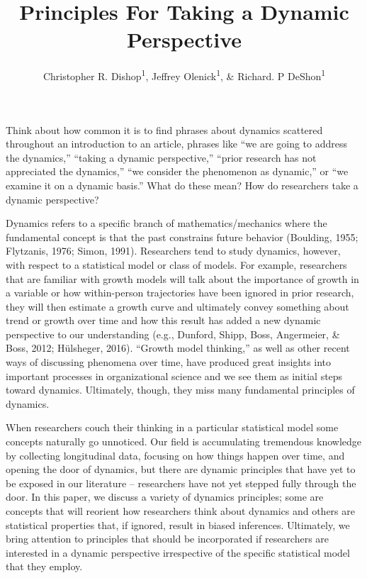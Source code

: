 \documentclass[english,,man]{apa6}
\title{Principles For Taking a Dynamic Perspective}
\author{Christopher R. Dishop\textsuperscript{1}, Jeffrey
Olenick\textsuperscript{1}, \& Richard. P DeShon\textsuperscript{1}}
\date{}
\affiliation{
\vspace{0.5cm}
\textsuperscript{1} Michigan State University}
\theoremstyle{definition}
\theoremstyle{definition}
\theoremstyle{definition}
\theoremstyle{remark}
\begin{document}
\maketitle

Think about how common it is to find phrases about dynamics scattered
throughout an introduction to an article, phrases like \enquote{we are
going to address the dynamics,} \enquote{taking a dynamic perspective,}
\enquote{prior research has not appreciated the dynamics,} \enquote{we
consider the phenomenon as dynamic,} or \enquote{we examine it on a
dynamic basis.} What do these mean? How do researchers take a dynamic
perspective?

Dynamics refers to a specific branch of mathematics/mechanics where the
fundamental concept is that the past constrains future behavior
(Boulding, 1955; Flytzanis, 1976; Simon, 1991). Researchers tend to
study dynamics, however, with respect to a statistical model or class of
models. For example, researchers that are familiar with growth models
will talk about the importance of growth in a variable or how
within-person trajectories have been ignored in prior research, they
will then estimate a growth curve and ultimately convey something about
trend or growth over time and how this result has added a new dynamic
perspective to our understanding (e.g., Dunford, Shipp, Boss,
Angermeier, \& Boss, 2012; Hülsheger, 2016). \enquote{Growth model
thinking,} as well as other recent ways of discussing phenomena over
time, have produced great insights into important processes in
organizational science and we see them as initial steps toward dynamics.
Ultimately, though, they miss many fundamental principles of dynamics.

When researchers couch their thinking in a particular statistical model
some concepts naturally go unnoticed. Our field is accumulating
tremendous knowledge by collecting longitudinal data, focusing on how
things happen over time, and opening the door of dynamics, but there are
dynamic principles that have yet to be exposed in our literature --
researchers have not yet stepped fully through the door. In this paper,
we discuss a variety of dynamics principles; some are concepts that will
reorient how researchers think about dynamics and others are statistical
properties that, if ignored, result in biased inferences. Ultimately, we
bring attention to principles that should be incorporated if researchers
are interested in a dynamic perspective irrespective of the specific
statistical model that they employ.
\end{document}
